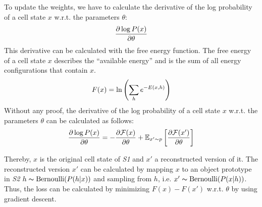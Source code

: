 To update the weights, we have to calculate the derivative of the log probability of a cell state $x$ w.r.t. the parameters $\theta$:
\begin{align}\eqlbl{l2_energy7}
	\frac{\partial \log P(x)}{\partial \theta }
\end{align}
This derivative can be calculated with the free energy function. The free energy of a cell state $x$ describes the ``available energy'' and is the sum of all energy configurations that contain $x$.
\begin{align}\eqlbl{l2_energy8}
	F(x) = \ln \left( \sum_h e^{-E(x,h)} \right)
\end{align}
Without any proof, the derivative of the log probability of a cell state $x$ w.r.t. the parameters $\theta$ can be calculated as follows:
\begin{align}\eqlbl{l2_energy9}
	\frac{\partial \log P(x)}{\partial \theta } = - \frac{\partial \mathcal{F}(x)}{\partial \theta} + \mathbb{E}_{x' \sim p} \left[ \frac{\partial \mathcal{F}(x')}{\partial \theta}  \right]
\end{align}

Thereby, $x$ is the original cell state of \emph{S1} and $x'$ a reconstructed version of it.
The reconstructed version $x'$ can be calculated by mapping $x$ to an object prototype in \emph{S2}  $h \thicksim \text{Bernoulli}(P(h | x) )$ and sampling from $h$, i.e. $x' \thicksim \text{Bernoulli}(P(x | h))$.
Thus, the loss can be calculated by minimizing $F(x) - F(x')$ w.r.t. $\theta$ by using gradient descent.





